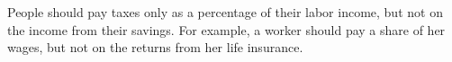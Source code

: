 People should pay taxes only as a percentage of their labor income, but not on the income from their savings.
For example, a worker should pay a share of her wages, but not on the returns from her life insurance.